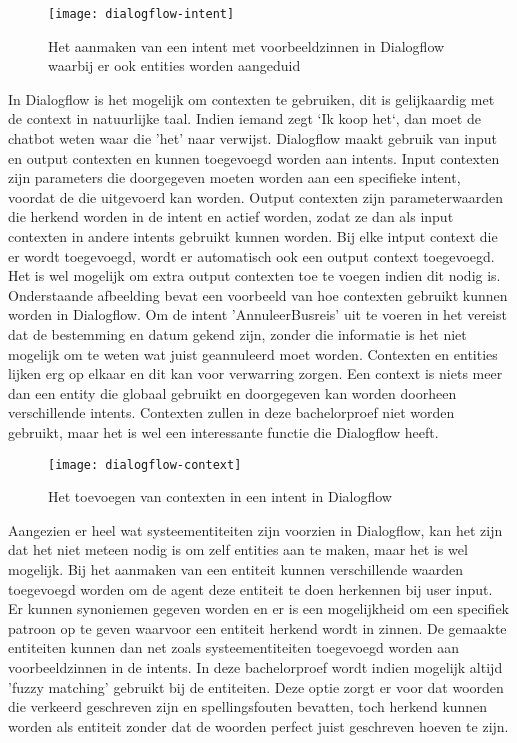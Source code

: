 \begin{figure}[H]
    \label{fig:dialogflow-intent}
    \centering
    \texttt{[image: dialogflow-intent]}
    \caption{Het aanmaken van een intent met voorbeeldzinnen in Dialogflow waarbij er ook entities worden aangeduid}
\end{figure}

In Dialogflow is het mogelijk om contexten te gebruiken, dit is gelijkaardig met de context in natuurlijke taal. Indien iemand zegt `Ik koop het`, dan moet de chatbot weten waar die 'het' naar verwijst. Dialogflow maakt gebruik van input en output contexten en kunnen toegevoegd worden aan intents. Input contexten zijn parameters die doorgegeven moeten worden aan een specifieke intent, voordat de die uitgevoerd kan worden. Output contexten zijn parameterwaarden die herkend worden in de intent en actief worden, zodat ze dan als input contexten in andere intents gebruikt kunnen worden. Bij elke intput context die er wordt toegevoegd, wordt er automatisch ook een output context toegevoegd. Het is wel mogelijk om extra output contexten toe te voegen indien dit nodig is. Onderstaande afbeelding bevat een voorbeeld van hoe contexten gebruikt kunnen worden in Dialogflow. Om de intent 'AnnuleerBusreis' uit te voeren in het vereist dat de bestemming en datum gekend zijn, zonder die informatie is het niet mogelijk om te weten wat juist geannuleerd moet worden. Contexten en entities lijken erg op elkaar en dit kan voor verwarring zorgen. Een context is niets meer dan een entity die globaal gebruikt en doorgegeven kan worden doorheen verschillende intents. Contexten zullen in deze bachelorproef niet worden gebruikt, maar het is wel een interessante functie die Dialogflow heeft.

\begin{figure}[H]
    \label{fig:dialogflow-context}
    \centering
    \texttt{[image: dialogflow-context]}
    \caption{Het toevoegen van contexten in een intent in Dialogflow}
\end{figure}

Aangezien er heel wat systeementiteiten zijn voorzien in Dialogflow, kan het zijn dat het niet meteen nodig is om zelf entities aan te maken, maar het is wel mogelijk. Bij het aanmaken van een entiteit kunnen verschillende waarden toegevoegd worden om de agent deze entiteit te doen herkennen bij user input. Er kunnen synoniemen gegeven worden en er is een mogelijkheid om een specifiek patroon op te geven waarvoor een entiteit herkend wordt in zinnen. De gemaakte entiteiten kunnen dan net zoals systeementiteiten toegevoegd worden aan voorbeeldzinnen in de intents. In deze bachelorproef wordt indien mogelijk altijd 'fuzzy matching' gebruikt bij de entiteiten. Deze optie zorgt er voor dat woorden die verkeerd geschreven zijn en spellingsfouten bevatten, toch herkend kunnen worden als entiteit zonder dat de woorden perfect juist geschreven hoeven te zijn.

